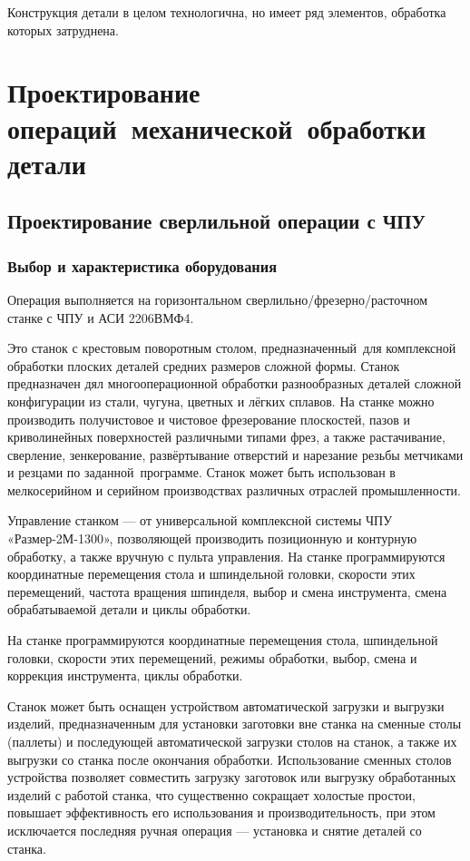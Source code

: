 \documentclass[14pt,russian,a4paper]{extreport}
\begin{document}
Конструкция детали в целом технологична, но имеет ряд элементов, обработка которых затруднена.


\chapter{Проектирование операций механической обработки детали}

\section{Проектирование сверлильной операции с ЧПУ}

\subsection{Выбор и характеристика оборудования}
Операция выполняется на горизонтальном сверлильно\-/фрезерно\-/расточном станке с ЧПУ и АСИ 2206ВМФ4. 

Это станок с крестовым поворотным столом, предназначенный для комплексной обработки плоских деталей средних размеров сложной формы. Станок предназначен дял многооперационной обработки разнообразных деталей сложной конфигурации из стали, чугуна, цветных и лёгких сплавов. На станке можно производить получистовое и чистовое фрезерование плоскостей, пазов и криволинейных поверхностей различными типами фрез, а также растачивание, сверление, зенкерование, развёртывание отверстий и нарезание резьбы метчиками и резцами по заданной программе. Станок может быть использован в мелкосерийном и серийном производствах различных отраслей промышленности.

Управление станком --- от универсальной комплексной системы ЧПУ «Размер-2М-1300», позволяющей производить позиционную и контурную обработку, а также вручную с пульта управления. На станке программируются координатные перемещения стола и шпиндельной головки, скорости этих перемещений, частота вращения шпинделя, выбор и смена инструмента, смена обрабатываемой детали и циклы обработки.

На станке программируются координатные перемещения стола, шпиндельной головки, скорости этих перемещений, режимы обработки, выбор, смена и коррекция инструмента, циклы обработки.

Станок может быть оснащен устройством автоматической загрузки и выгрузки изделий, предназначенным для установки заготовки вне станка на сменные столы (паллеты) и последующей автоматической загрузки столов на станок, а также их выгрузки со станка после окончания обработки. Использование сменных столов устройства позволяет совместить загрузку заготовок или выгрузку обработанных изделий с работой станка, что существенно сокращает холостые простои, повышает эффективность его использования и производительность, при этом исключается последняя ручная операция --- установка и снятие деталей со станка.
\end{document}
